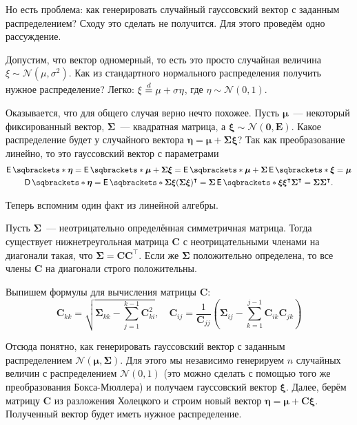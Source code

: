 Но есть проблема: как генерировать случайный гауссовский вектор с заданным 
распределением? Сходу это сделать не получится. Для этого проведём одно 
рассуждение.

Допустим, что вектор одномерный, то есть это просто случайная величина \(\xi 
\sim \mathcal{N}(\mu, \sigma^{2})\). Как из стандартного нормального 
распределения получить нужное распределение? Легко: \(\xi \overset{d}{=} \mu + 
\sigma\eta\), где \(\eta \sim \mathcal{N}(0, 1)\).

Оказывается, что для общего случая верно нечто похожее. Пусть \(\bm{\mu}\)~--- 
некоторый фиксированный вектор, \(\bm{\Sigma}\)~--- квадратная матрица, а 
\(\bm{\xi} \sim \mathcal{N}(\mathbf{0}, \mathbf{E})\). Какое распределение 
будет у случайного вектора \(\bm{\eta} = \bm{\mu} + \bm{\Sigma\xi}\)? Так как 
преобразование линейно, то это гауссовский вектор с параметрами
\begin{gather*}
	\E{\bm{\eta}} = \E{\bm{\mu} + \bm{\Sigma\xi}} = \E{\bm{\mu}} + 
	\bm{\Sigma}\E{\bm{\xi}} = \bm{\mu} \\
	\D{\bm{\eta}} = \E{\bm{\Sigma\xi}(\bm{\Sigma\xi})^{\intercal}} = 
	\bm{\Sigma}\E{\bm{\xi}\bm{\xi}^{\intercal}}\bm{\Sigma}^{\intercal} = 
	\bm{\Sigma}\bm{\Sigma}^{\intercal}.
\end{gather*}

Теперь вспомним один факт из линейной алгебры.
\begin{theorem}
	Пусть \(\bm{\Sigma}\)~--- неотрицательно определённая симметричная матрица. 
	Тогда существует нижнетреугольная матрица \(\mathbf{C}\) с неотрицательными 
	членами на диагонали такая, что \(\bm{\Sigma} = \mathbf{CC}^{\intercal}\). 
	Если же \(\bm{\Sigma}\) положительно определена, то все члены 
	\(\mathbf{C}\) на диагонали строго положительны.
\end{theorem}

Выпишем формулы для вычисления матрицы \(\mathbf{C}\):
\[
	\mathbf{C}_{kk} = \sqrt{\bm{\Sigma}_{kk} - \sum_{j = 1}^{k - 1} 
	\mathbf{C}^{2}_{ki}}, \quad \mathbf{C}_{ij} = 
	\frac{1}{\mathbf{C}_{jj}}\left(\bm{\Sigma}_{ij} - \sum_{k = 1}^{j - 1} 
	\mathbf{C}_{ik}\mathbf{C}_{jk}\right)
\]

Отсюда понятно, как генерировать гауссовский вектор с заданным распределением 
\(\mathcal{N}(\bm{\mu}, \bm{\Sigma})\). Для этого мы независимо генерируем 
\(n\) случайных величин с распределением \(\mathcal{N}(0, 1)\) (это можно 
сделать с помощью того же преобразования Бокса-Мюллера) и получаем гауссовский 
вектор \(\bm{\xi}\). Далее, берём матрицу \(\mathbf{C}\) из разложения 
Холецкого и строим новый вектор \(\bm{\eta} = \bm{\mu} + \mathbf{C}\bm{\xi}\). 
Полученный вектор будет иметь нужное распределение.

